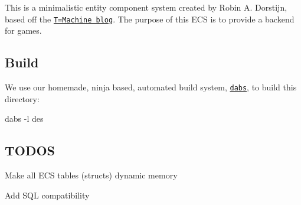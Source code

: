 This is a minimalistic entity component system created by Robin A. Dorstijn, based off the \href{http://t-machine.org}{\tt T=Machine blog}. The purpose of this E\+CS is to provide a backend for games.

\subsection*{Build}

We use our homemade, ninja based, automated build system, \href{https://github.com/Drvanon/dabs}{\tt dabs}, to build this directory\+: 
\begin{DoxyCode}
dabs -l des
\end{DoxyCode}


\subsection*{T\+O\+D\+OS}


\begin{DoxyItemize}
\item Make all E\+CS tables (structs) dynamic memory
\item Add S\+QL compatibility 
\end{DoxyItemize}